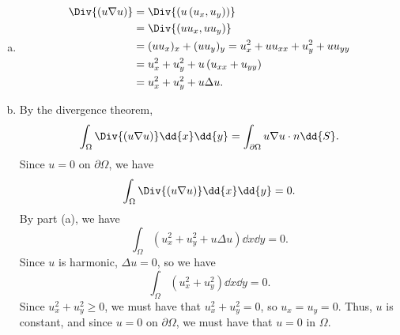 \documentclass[plain]{pset}
\begin{document}
\begin{solution}
    \leavevmode
    \begin{enumerate}[(a)]
        \item \leavevmode
              \begin{align*}
                  \Div{(u\nabla u)} & = \Div{\left(u\left(u_x, u_y\right)\right)}                            \\
                                    & = \Div{\left(uu_x, uu_y\right)}                           \\
                                    & = (uu_x)_x + (uu_y)_y = u_x^2 + uu_{xx} + u_y^2 + uu_{yy} \\
                                    & = u_x^2 + u_y^2 + u \left(u_{xx} + u_{yy}\right)         \\
                                    & = u_x^2 + u_y^2 + u\Delta u.
              \end{align*}
        \item By the divergence theorem,
              \[\int_\Omega \Div{(u\nabla u)} \dd{x} \dd{y} = \int_{\partial \Omega} u\nabla u \cdot n \dd{S}.\]
              Since \(u = 0\) on \(\partial \Omega\), we have
              \[\int_\Omega \Div{(u\nabla u)} \dd{x} \dd{y} = 0.\]
              By part (a), we have
              \[\int_\Omega \left(u_x^2 + u_y^2 + u\Delta u\right) \dd{x} \dd{y} = 0.\]
              Since \(u\) is harmonic, \(\Delta u = 0\), so we have
              \[\int_\Omega \left(u_x^2 + u_y^2\right) \dd{x} \dd{y} = 0.\]
              Since \(u_x^2 + u_y^2 \geq 0\), we must have that \(u_x^2 + u_y^2 = 0\), so \(u_x = u_y = 0\). Thus, \(u\) is constant, and since \(u = 0\) on \(\partial \Omega\), we must have that \(u = 0\) in \(\Omega\).

    \end{enumerate}
\end{solution}
\end{document}
